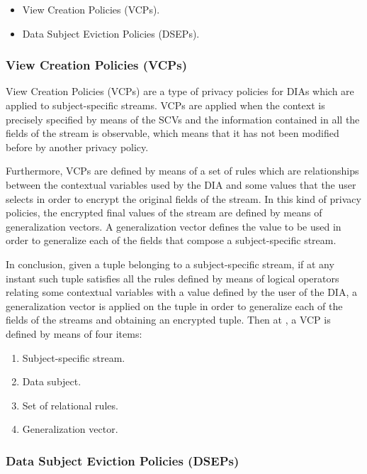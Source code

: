 \begin{itemize}

\item View Creation Policies (VCPs).
\item Data Subject Eviction Policies (DSEPs).

\end{itemize}

\subsubsection{View Creation Policies (VCPs)}

View Creation Policies (VCPs) are a type of privacy policies for DIAs which are applied to subject-specific streams. VCPs are applied when the context is precisely specified by means of the SCVs and the information contained in all the fields of the stream is observable, which means that it has not been modified before by another privacy policy.

Furthermore, VCPs are defined by means of a set of rules which are relationships between the contextual variables used by the DIA and some values that the user selects in order to encrypt the original fields of the stream. In this kind of privacy policies, the encrypted final values of the stream are defined by means of generalization vectors. A generalization vector defines the value to be used in order to generalize each of the fields that compose a subject-specific stream.

In conclusion, given a tuple belonging to a subject-specific stream, if at any instant such tuple satisfies all the rules defined by means of logical operators relating some contextual variables with a value defined by the user of the DIA, a generalization vector is applied on the tuple in order to generalize each of the fields of the streams and obtaining an encrypted tuple. Then at \cite{privacypoliciesarticle}, a VCP is defined by means of four items:

\begin{enumerate}

\item Subject-specific stream.
\item Data subject.
\item Set of relational rules.
\item Generalization vector.

\end{enumerate}

\subsubsection{Data Subject Eviction Policies (DSEPs)}

